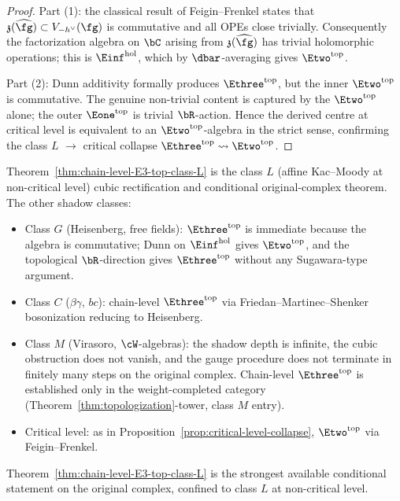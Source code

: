\begin{proof}
Part (1): the classical result of Feigin--Frenkel states that
$\mathfrak{z}(\widehat{\fg}) \subset V_{-h^\vee}(\fg)$ is commutative
and all OPEs close trivially. Consequently the factorization
algebra on $\bC$ arising from $\mathfrak{z}(\widehat{\fg})$ has
trivial holomorphic operations; this is
$\Einf^{\mathrm{hol}}$, which by $\dbar$-averaging gives
$\Etwo^{\mathrm{top}}$.

Part (2): Dunn additivity formally produces
$\Ethree^{\mathrm{top}}$, but the inner $\Etwo^{\mathrm{top}}$ is
commutative. The genuine non-trivial content is captured by the
$\Etwo^{\mathrm{top}}$ alone; the outer $\Eone^{\mathrm{top}}$ is
trivial $\bR$-action. Hence the derived centre at critical level
is equivalent to an $\Etwo^{\mathrm{top}}$-algebra in the strict
sense, confirming the class $L$ $\to$ critical collapse
$\Ethree^{\mathrm{top}} \rightsquigarrow \Etwo^{\mathrm{top}}$.
\end{proof}

\begin{remark}
\label{rem:scope-chain-level}
Theorem~\ref{thm:chain-level-E3-top-class-L} is the class $L$
(affine Kac--Moody at non-critical level) cubic rectification and
conditional original-complex theorem. The other
shadow classes:
\begin{itemize}
 \item Class $G$ (Heisenberg, free fields): $\Ethree^{\mathrm{top}}$
 is immediate because the algebra is commutative; Dunn on
 $\Einf^{\mathrm{hol}}$ gives $\Etwo^{\mathrm{top}}$, and the
 topological $\bR$-direction gives $\Ethree^{\mathrm{top}}$
 without any Sugawara-type argument.
 \item Class $C$ ($\beta\gamma$, $bc$): chain-level
 $\Ethree^{\mathrm{top}}$ via Friedan--Martinec--Shenker
 bosonization reducing to Heisenberg.
 \item Class $M$ (Virasoro, $\cW$-algebras): the shadow depth is
 infinite, the cubic obstruction does not vanish, and the gauge
 procedure does not terminate in finitely many steps on the
 original complex. Chain-level $\Ethree^{\mathrm{top}}$ is
 established only in the weight-completed category
 (Theorem~\ref{thm:topologization}-tower, class $M$ entry).
 \item Critical level: as in
 Proposition~\ref{prop:critical-level-collapse},
 $\Etwo^{\mathrm{top}}$ via Feigin--Frenkel.
\end{itemize}
Theorem~\ref{thm:chain-level-E3-top-class-L} is the strongest
available conditional statement on the original complex, confined
to class $L$ at non-critical level.
\end{remark}

